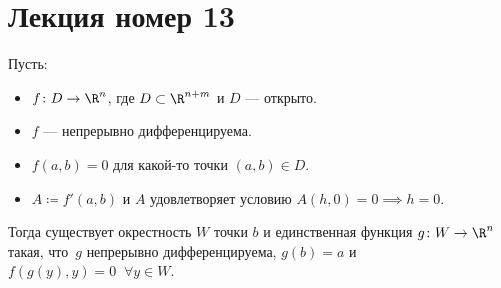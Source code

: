 \section{Лекция номер 13}

\begin{theorem} 
  Пусть:
  \begin{itemize}
    \item $f \colon D \to \R^n$, где $D \subset \R^{n + m}$ и $D$ --- открыто.
    \item $f$ --- непрерывно дифференцируема.
    \item $f(a, b) = 0$ для какой-то точки $(a, b) \in D$.
    \item $A \coloneqq f'(a, b)$ и $A$ удовлетворяет условию $A(h, 0) = 0 \implies h = 0$.
  \end{itemize}
  Тогда существует окрестность $W$ точки $b$ и единственная функция $g\colon W \to \R^n$ такая, что~$g$ непрерывно дифференцируема, $g(b) = a$ и $f(g(y), y) = 0\;\; \forall y \in W$.
\end{theorem}
